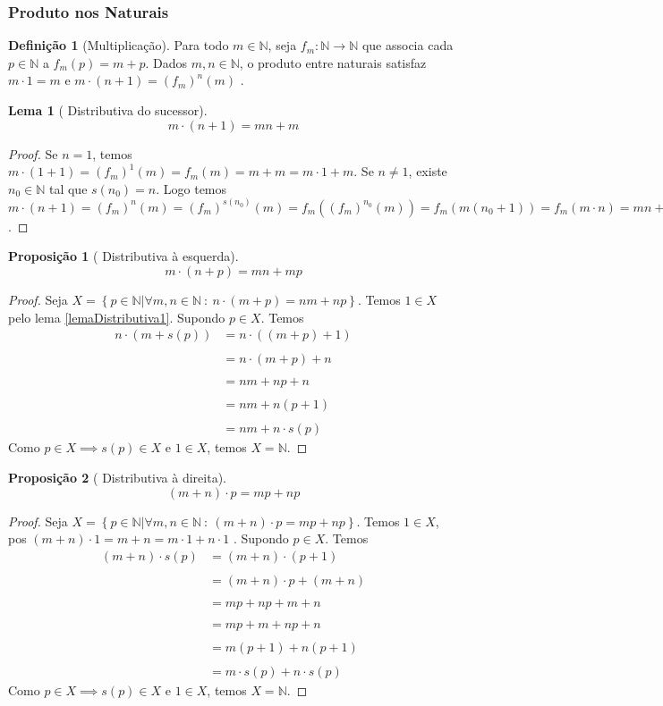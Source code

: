 \documentclass{article}
\newtheorem{prop}{Proposição}[section]
\theoremstyle{theorem}
\theoremstyle{lemma}
\newtheorem{lema}{Lema}
\theoremstyle{definition}
\newtheorem{definicao}{Definição}[section]
\theoremstyle{remark}
\begin{document}
\subsubsection{Produto nos Naturais}
\begin{definicao}[Multiplicação]
	Para todo $m\in \mathbb{N}$, seja $f_m : \mathbb{N} \to \mathbb{N}$ que associa cada $p\in \mathbb{N}$ a $f_m(p) = m+p$.
	Dados $m,n \in \mathbb{N}$, o produto entre naturais satisfaz $m\cdot 1 = m$ e  $ m\cdot (n+1) = (f_m)^n(m)$ .
\end{definicao}
\begin{lema}[ Distributiva do sucessor]
	$$m\cdot(n+1) = mn +m$$
\end{lema}
\begin{proof}
	\label{lemaDistributiva1}
	Se $n = 1$, temos  $m\cdot(1+1) = (f_m)^1(m) = f_m(m) = m+m = m\cdot 1 +m$. Se $n\neq 1$, existe $n_0\in \mathbb{N}$ tal que $s(n_0) = n$. Logo temos $m\cdot( n +1) = (f_m)^{n}(m) = (f_m)^{s(n_0)}(m) =   f_m( (f_m)^{n_0} (m)) = f_m( m(n_0+1)) = f_m(m \cdot n ) =  mn+m$.
\end{proof}
\begin{prop}[ Distributiva à esquerda]
	$$m\cdot(n+p) = mn +mp$$
\end{prop}
\begin{proof}
	Seja $X = \left\{p \in \mathbb{N} | \forall m,n \in \mathbb{N} \: : \:  n\cdot(m+p) = nm + np\right\}$. Temos $1\in X$ pelo lema \ref{lemaDistributiva1}. Supondo $p\in X$. Temos \begin{align*}
		n\cdot(m+s(p)) &= n\cdot ((m+p)+1)  \\~\\
		&= n\cdot(m+p) + n\\~\\
		&= nm+np+n\\~\\
		&=nm+n(p+1)\\~\\
		&=nm+n\cdot s(p)
	\end{align*}
	Como $p\in X\implies s(p) \in X $ e $1\in X$, temos $X = \mathbb{N}$.
\end{proof}
\begin{prop}[ Distributiva à direita]
	$$(m+n)\cdot p = mp +np$$
\end{prop}
\begin{proof}
	Seja $X = \left\{p \in \mathbb{N} | \forall m,n \in \mathbb{N} \: : \:  (m+n)\cdot p = mp + np\right\}$. Temos $1\in X$, pos $(m+n)\cdot 1 = m+n = m\cdot 1 + n \cdot 1$ . Supondo $p\in X$. Temos \begin{align*}
		(m+n)\cdot s(p) &= (m+n)\cdot(p+1)  \\~\\
		&= (m+n)\cdot p + (m+n)\\~\\
		&= mp+np+m+n\\~\\
		&=mp+m+ np+n\\~\\
		&=m(p+1)+ n(p+1)\\~\\
		&=m\cdot s(p) + n\cdot s(p)
	\end{align*}
	Como $p\in X\implies s(p) \in X $ e $1\in X$, temos $X = \mathbb{N}$.
\end{proof}
\end{document}
